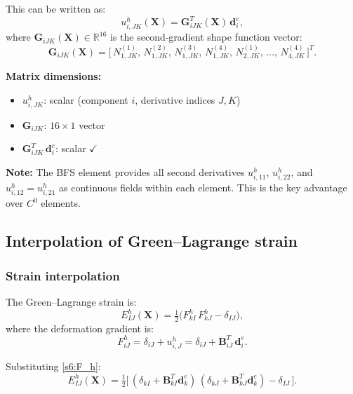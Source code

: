 \documentclass[11pt]{article}
\newcommand{\bX}{\mathbf{X}}
\newcommand{\bX}{\mathbf{X}}
\begin{document}
This can be written as:
\begin{equation}
\boxed{
u_{i,JK}^{h}(\bX) = \mathbf{G}_{iJK}^{T}(\bX)\,\mathbf{d}_{i}^{e},
}
\label{s6:u_2nd_matrix}
\end{equation}
where $\mathbf{G}_{iJK}(\bX)\in\mathbb{R}^{16}$ is the second-gradient
shape function vector:
\begin{equation}
\mathbf{G}_{iJK}(\bX)
= \bigl[\,
   N_{1,JK}^{(1)},\,N_{1,JK}^{(2)},\,N_{1,JK}^{(3)},\,N_{1,JK}^{(4)},
   \,N_{2,JK}^{(1)},\,\ldots,\,N_{4,JK}^{(4)}
\,\bigr]^{T}.
\end{equation}

\textbf{Matrix dimensions:}
\begin{itemize}
\item $u_{i,JK}^{h}$: scalar (component $i$, derivative indices $J,K$)
\item $\mathbf{G}_{iJK}$: $16\times 1$ vector
\item $\mathbf{G}_{iJK}^{T}\,\mathbf{d}_{i}^{e}$: scalar $\checkmark$
\end{itemize}

\textbf{Note:} The BFS element provides all second derivatives
$u_{i,11}^{h}$, $u_{i,22}^{h}$, and $u_{i,12}^{h}=u_{i,21}^{h}$ as
continuous fields within each element. This is the key advantage over
$C^{0}$ elements.

\subsection{Interpolation of Green--Lagrange strain}
\label{ssec:strain_interp}

\subsubsection{Strain interpolation}

The Green--Lagrange strain is:
\begin{equation}
E_{IJ}^{h}(\bX)
= \tfrac12\bigl(F_{kI}^{h}\,F_{kJ}^{h} - \delta_{IJ}\bigr),
\end{equation}
where the deformation gradient is:
\begin{equation}
F_{iJ}^{h} = \delta_{iJ} + u_{i,J}^{h}
= \delta_{iJ} + \mathbf{B}_{iJ}^{T}\,\mathbf{d}_{i}^{e}.
\label{s6:F_h}
\end{equation}

Substituting \eqref{s6:F_h}:
\begin{equation}
\boxed{
E_{IJ}^{h}(\bX)
= \tfrac12\bigl[\,
   (\delta_{kI}+\mathbf{B}_{kI}^{T}\mathbf{d}_{k}^{e})\,
   (\delta_{kJ}+\mathbf{B}_{kJ}^{T}\mathbf{d}_{k}^{e})
   - \delta_{IJ}
\,\bigr].
}
\label{s6:E_h}
\end{equation}
\end{document}

